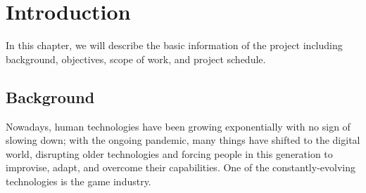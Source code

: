 \documentclass[12pt,oneside,openright,a4paper]{cpe-english-project}
\begin{document}
%



\chapter{Introduction}
\hspace{2em}In this chapter, we will describe the basic information of the project including background, objectives, scope of work, and project schedule.


\section{Background} 
\hspace{2em}Nowadays, human technologies have been growing exponentially with no sign of slowing down; with the ongoing pandemic, many things have shifted to the digital world, disrupting older technologies and forcing people in this generation to improvise, adapt, and overcome their capabilities. One of the constantly-evolving technologies is the game industry.
\end{document}

